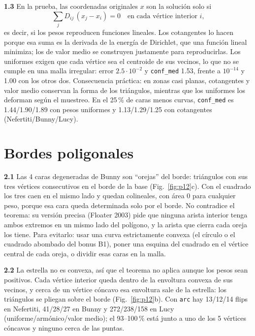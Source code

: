 \documentclass[
	spanish, %
	a4paper, oneside
]{article}
\newcommand{\code}[1]{\texttt{#1}}
\newcommand{\preg}[1]{\textbf{#1}\enspace}
\begin{document}
\preg{1.3} En la prueba, las coordenadas originales $x$ son la solución solo si
\[
\sum_j D_{ij}\,(x_j-x_i)=0\quad\text{en cada vértice interior $i$,}
\]
es decir, si los pesos reproducen funciones lineales. Los cotangentes lo hacen porque esa suma es la derivada de la energía de Dirichlet, que una función lineal minimiza; los de valor medio se construyen justamente para reproducirlas. Los uniformes exigen que cada vértice sea el centroide de sus vecinos, lo que no se cumple en una malla irregular: error $2.5\cdot10^{-2}$ y \code{conf\_med} 1.53, frente a $10^{-14}$ y 1.00 con los otros dos. Consecuencia práctica: en zonas casi planas, cotangentes y valor medio conservan la forma de los triángulos, mientras que los uniformes los deforman según el muestreo. En el 25\,\% de caras menos curvas, \code{conf\_med} es 1.44/1.90/1.89 con pesos uniformes y 1.13/1.29/1.25 con cotangentes (Nefertiti/Bunny/Lucy).

\section{Bordes poligonales}
\preg{2.1} Las 4 caras degeneradas de Bunny son ``orejas'' del borde: triángulos con sus tres vértices consecutivos en el borde de la base (Fig.~\ref{fig:p12}c). Con el cuadrado los tres caen en el mismo lado y quedan colineales, con área 0 para cualquier peso, porque esa cara queda determinada solo por el borde. No contradice el teorema: su versión precisa (Floater 2003) pide que ninguna arista interior tenga ambos extremos en un mismo lado del polígono, y la arista que cierra cada oreja los tiene. Para evitarlo: usar una curva estrictamente convexa (el círculo o el cuadrado abombado del bonus B1), poner una esquina del cuadrado en el vértice central de cada oreja, o dividir esas caras en la malla.

\preg{2.2} La estrella no es convexa, así que el teorema no aplica aunque los pesos sean positivos. Cada vértice interior queda dentro de la envoltura convexa de sus vecinos, y cerca de un vértice cóncavo esa envoltura sale de la estrella: los triángulos se pliegan sobre el borde (Fig.~\ref{fig:p12}b). Con \code{arc} hay 13/12/14 flips en Nefertiti, 41/28/27 en Bunny y 272/238/158 en Lucy (uniforme/armónico/valor medio); el 93--100\,\% está junto a uno de los 5 vértices cóncavos y ninguno cerca de las puntas.
\end{document}
